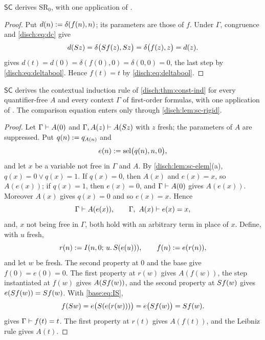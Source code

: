 \begin{lemma}
\label{disch:lem:sc-rigid}
$\mathsf{SC}$ derives $\mathrm{SR}_0$, with one application of
.
\end{lemma}

\begin{proof}
Put $d(n)\mathrel{:=}\delta(f(n),n)$; its parameters are those of $f$. Under
$\Gamma$, congruence and \eqref{disch:eq:dc} give
\[
 d(S z)=\delta\bigl(S f(z),S z\bigr)=\delta\bigl(f(z),z\bigr)=d(z).
\]
 gives $d(t)=d(0)=\delta(f(0),0)=\delta(0,0)=0$, the last
step by \eqref{disch:eq:deltabool}. Hence $f(t)=t$ by
\eqref{disch:eq:deltabool}.
\end{proof}

\begin{theorem}
\label{disch:thm:sc-ind}
$\mathsf{SC}$ derives the contextual induction rule of
\cref{disch:thm:const-ind} for every quantifier-free $A$ and every context
$\Gamma$ of first-order formulas, with one application of .
The comparison equation enters only through \cref{disch:lem:sc-rigid}.
\end{theorem}

\begin{proof}
Let $\Gamma\vdash A(0)$ and $\Gamma,A(z)\vdash A(S z)$ with $z$ fresh;
the parameters of $A$ are suppressed. Put $q(n)\mathrel{:=} q_{A(n)}$ and
\[
 e(n)\mathrel{:=}\operatorname{sel}\bigl(q(n),n,0\bigr),
\]
and let $x$ be a variable not free in $\Gamma$ and $A$. By
\cref{disch:lem:sc-elem}(a), $q(x)=0\lor q(x)=1$. If $q(x)=0$, then $A(x)$
and $e(x)=x$, so $A(e(x))$; if $q(x)=1$, then $e(x)=0$, and $\Gamma\vdash A(0)$
gives $A(e(x))$. Moreover $A(x)$ gives $q(x)=0$ and so $e(x)=x$. Hence
\[
 \Gamma\proves A(e(x)),\qquad \Gamma,\ A(x)\proves e(x)=x,
\]
and, $x$ not being free in $\Gamma$, both hold with an arbitrary term in place
of $x$. Define, with $u$ fresh,
\[
 r(n)\mathrel{:=}I(n,0;\,u.\,S(e(u))),\qquad f(n)\mathrel{:=} e(r(n)),
\]
and let $w$ be fresh. The second property at $0$ and the base give
$f(0)=e(0)=0$. The first property at $r(w)$ gives $A(f(w))$, the step
instantiated at $f(w)$ gives $A(S f(w))$, and the second property at
$S f(w)$ gives $e(S f(w))=S f(w)$. With \eqref{base:eq:IS},
\[
 f(S w)=e\bigl(S(e(r(w)))\bigr)=e\bigl(S f(w)\bigr)=S f(w).
\]
 gives $\Gamma\vdash f(t)=t$. The first property
at $r(t)$ gives $A(f(t))$, and the Leibniz rule gives $A(t)$.
\end{proof}

